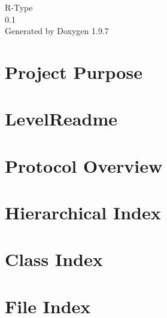 \documentclass[twoside]{book}
\newcommand{\+}{\discretionary{\mbox{\scriptsize$\hookleftarrow$}}{}{}}
\newcommand{\clearemptydoublepage}{%
    \newpage{\pagestyle{empty}\cleardoublepage}%
  }
\begin{document}
  \raggedbottom
    \hypersetup{pageanchor=false,
                bookmarksnumbered=true,
                pdfencoding=unicode
               }
  \begin{titlepage}
  \vspace*{7cm}
  \begin{center}%
  {\Large R-\/\+Type}\\
  [1ex]\large 0.\+1 \\
  \vspace*{1cm}
  {\large Generated by Doxygen 1.9.7}\\
  \end{center}
  \end{titlepage}
  \clearemptydoublepage
  \tableofcontents
  \clearemptydoublepage
  \hypersetup{pageanchor=true}
\chapter{Project Purpose}
\label{index}\hypertarget{index}{}
\chapter{Level\+Readme}
\label{md_Server_config_LevelReadme}

\chapter{Protocol Overview}
\label{md_Server_Protocol}

\chapter{Hierarchical Index}

\chapter{Class Index}

\chapter{File Index}

\end{document}

